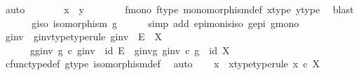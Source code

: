 \begin{isabellebody}
\ auto\isanewline
\ \ \ \ \isamarkupfalse%
\ \isamarkupfalse%
\ {\isachardoublequoteopen}x\ {\isacharequal}{\kern0pt}\ y{\isachardoublequoteclose}\isanewline
\ \ \ \ \ \ \isamarkupfalse%
\ f{\isacharunderscore}{\kern0pt}mono\ f{\isacharunderscore}{\kern0pt}type\ monomorphism{\isacharunderscore}{\kern0pt}def{}\ x{\isacharunderscore}{\kern0pt}type\ y{\isacharunderscore}{\kern0pt}type\ \isamarkupfalse%
\ blast\isanewline
\ \ \isamarkupfalse%
\isanewline
\isanewline
\ \ \isamarkupfalse%
\ g{\isacharunderscore}{\kern0pt}iso{\isacharcolon}{\kern0pt}\ {\isachardoublequoteopen}isomorphism\ g{\isachardoublequoteclose}\isanewline
\ \ \ \ \isamarkupfalse%
\ {\isacharparenleft}{\kern0pt}simp\ add{\isacharcolon}{\kern0pt}\ epi{\isacharunderscore}{\kern0pt}mon{\isacharunderscore}{\kern0pt}is{\isacharunderscore}{\kern0pt}iso\ g{\isacharunderscore}{\kern0pt}epi\ g{\isacharunderscore}{\kern0pt}mono{\isacharparenright}{\kern0pt}\isanewline
\ \ \isamarkupfalse%
\ \isamarkupfalse%
\ g{\isacharunderscore}{\kern0pt}inv\ \ g{\isacharunderscore}{\kern0pt}inv{\isacharunderscore}{\kern0pt}type{\isacharbrackleft}{\kern0pt}type{\isacharunderscore}{\kern0pt}rule{\isacharbrackright}{\kern0pt}{\isacharcolon}{\kern0pt}\ {\isachardoublequoteopen}g{\isacharunderscore}{\kern0pt}inv\ {\isacharcolon}{\kern0pt}\ E\ {\isasymrightarrow}\ X{\isachardoublequoteclose}\ \isanewline
\ \ \ \ \ \ g{\isacharunderscore}{\kern0pt}g{\isacharunderscore}{\kern0pt}inv{\isacharcolon}{\kern0pt}\ {\isachardoublequoteopen}g\ {\isasymcirc}\isactrlsub c\ g{\isacharunderscore}{\kern0pt}inv\ {\isacharequal}{\kern0pt}\ id\ E{\isachardoublequoteclose}\ \ g{\isacharunderscore}{\kern0pt}inv{\isacharunderscore}{\kern0pt}g{\isacharcolon}{\kern0pt}\ {\isachardoublequoteopen}g{\isacharunderscore}{\kern0pt}inv\ {\isasymcirc}\isactrlsub c\ g\ {\isacharequal}{\kern0pt}\ id\ X{\isachardoublequoteclose}\isanewline
\ \ \ \ \isamarkupfalse%
\ cfunc{\isacharunderscore}{\kern0pt}type{\isacharunderscore}{\kern0pt}def\ g{\isacharunderscore}{\kern0pt}type\ isomorphism{\isacharunderscore}{\kern0pt}def\ \isamarkupfalse%
\ auto\isanewline
\isanewline
\ \ \isamarkupfalse%
\ x\ \ x{\isacharunderscore}{\kern0pt}type{\isacharbrackleft}{\kern0pt}type{\isacharunderscore}{\kern0pt}rule{\isacharbrackright}{\kern0pt}{\isacharcolon}{\kern0pt}\ {\isachardoublequoteopen}x\ {\isasymin}\isactrlsub c\ X{\isachardoublequoteclose}\isanewline

\end{isabellebody}
